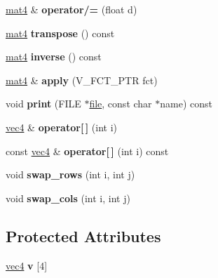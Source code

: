 \begin{DoxyCompactItemize}
\item 
\hypertarget{classmat4_a55320554d8728b264026823039736f7f}{\hyperlink{classmat4}{mat4} \& {\bfseries operator/=} (float d)}\label{classmat4_a55320554d8728b264026823039736f7f}

\item 
\hypertarget{classmat4_aab816366c2233c95eac70b2eab11e8e2}{\hyperlink{classmat4}{mat4} {\bfseries transpose} () const }\label{classmat4_aab816366c2233c95eac70b2eab11e8e2}

\item 
\hypertarget{classmat4_a90efa7f6bcd321d1433629c8e6c09af3}{\hyperlink{classmat4}{mat4} {\bfseries inverse} () const }\label{classmat4_a90efa7f6bcd321d1433629c8e6c09af3}

\item 
\hypertarget{classmat4_a2a80b0b0d4ed30044260e4d0c9074caf}{\hyperlink{classmat4}{mat4} \& {\bfseries apply} (V\+\_\+\+F\+C\+T\+\_\+\+P\+T\+R fct)}\label{classmat4_a2a80b0b0d4ed30044260e4d0c9074caf}

\item 
\hypertarget{classmat4_a598ace98030762e74988c34610ac16a6}{void {\bfseries print} (F\+I\+L\+E $\ast$\hyperlink{structfile}{file}, const char $\ast$name) const }\label{classmat4_a598ace98030762e74988c34610ac16a6}

\item 
\hypertarget{classmat4_a856496a5770f27f58e19064d27a05722}{\hyperlink{classvec4}{vec4} \& {\bfseries operator\mbox{[}$\,$\mbox{]}} (int i)}\label{classmat4_a856496a5770f27f58e19064d27a05722}

\item 
\hypertarget{classmat4_a58f5742e4149bf369ea0d1d494eb3d98}{const \hyperlink{classvec4}{vec4} \& {\bfseries operator\mbox{[}$\,$\mbox{]}} (int i) const }\label{classmat4_a58f5742e4149bf369ea0d1d494eb3d98}

\item 
\hypertarget{classmat4_ae6d0f4a616207d117712622d7eeab475}{void {\bfseries swap\+\_\+rows} (int i, int j)}\label{classmat4_ae6d0f4a616207d117712622d7eeab475}

\item 
\hypertarget{classmat4_af6a790983e368a25e7fa50679585eab8}{void {\bfseries swap\+\_\+cols} (int i, int j)}\label{classmat4_af6a790983e368a25e7fa50679585eab8}

\end{DoxyCompactItemize}
\subsection*{Protected Attributes}
\begin{DoxyCompactItemize}
\item 
\hypertarget{classmat4_a2ce0e685a8fdc40580a68ce01d8c28e9}{\hyperlink{classvec4}{vec4} {\bfseries v} \mbox{[}4\mbox{]}}\label{classmat4_a2ce0e685a8fdc40580a68ce01d8c28e9}

\end{DoxyCompactItemize}
